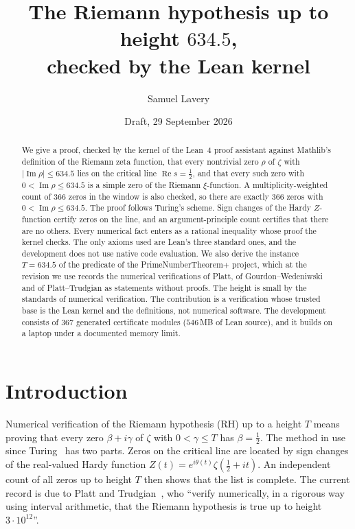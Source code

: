 \documentclass[11pt]{article}
\title{The Riemann hypothesis up to height $634.5$,\\ checked by the Lean kernel}
\author{Samuel Lavery}
\date{Draft, 29 September 2026}
\theoremstyle{definition}
\theoremstyle{remark}
\newcommand{\lean}[1]{\texttt{\detokenize{#1}}}
\newcommand{\Rea}{\operatorname{Re}}
\newcommand{\Ima}{\operatorname{Im}}
\begin{document}
\maketitle

\begin{abstract}
We give a proof, checked by the kernel of the Lean~4 proof assistant against Mathlib's definition of the Riemann zeta
function, that every nontrivial zero $\rho$ of $\zeta$ with $|\Ima\rho|\le 634.5$ lies on the critical line
$\Rea s=\tfrac12$, and that every such zero with $0<\Ima\rho\le 634.5$ is a simple zero of the Riemann $\xi$-function.
A multiplicity-weighted count of $366$ zeros in the window is also checked, so there are exactly $366$ zeros with
$0<\Ima\rho\le634.5$. The proof follows Turing's scheme. Sign changes of the Hardy $Z$-function certify zeros on the
line, and an argument-principle count certifies that there are no others. Every numerical fact enters as a rational
inequality whose proof the kernel checks. The only axioms used are Lean's three standard ones, and the development
does not use native code evaluation. We also derive the instance $T=634.5$ of the predicate \lean{riemannZeta.RH_up_to}
of the PrimeNumberTheorem+ project, which at the revision we use records the numerical verifications of Platt, of
Gourdon--Wedeniwski and of Platt--Trudgian as statements without proofs. The height is small by the standards of
numerical verification. The contribution is a verification whose trusted base is the Lean kernel and the definitions,
not numerical software. The development consists of $367$ generated certificate modules ($546$\,MB of Lean source), and it
builds on a laptop under a documented memory limit.
\end{abstract}

\section{Introduction}\label{sec:intro}

Numerical verification of the Riemann hypothesis (RH) up to a height $T$ means proving that every zero $\beta+i\gamma$
of $\zeta$ with $0<\gamma\le T$ has $\beta=\tfrac12$. The method in use since Turing~\cite{Turing1953} has two parts.
Zeros on the critical line are located by sign changes of the real-valued Hardy function
$Z(t)=e^{i\theta(t)}\zeta(\tfrac12+it)$. An independent count of all zeros up to height $T$ then shows that the list is
complete. The current record is due to Platt and Trudgian~\cite{PlattTrudgian2021}, who ``verify numerically, in a
rigorous way using interval arithmetic, that the Riemann hypothesis is true up to height $3\cdot10^{12}$''.
\end{document}
